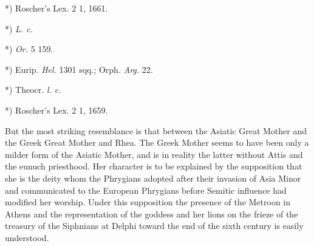 \documentclass[a4paper, 11pt, oneside, polutonikogreek, english]{article}
\begin{document}
*) Roscher's Lex. 2 1, 1661.

*) \emph{L. c.}

*) \emph{Or.} 5 159.

*) Eurip. \emph{Hel.} 1301 sqq.; Orph. \emph{Arg.} 22.

*) Theocr. \emph{l. c.}

*) Roscher's Lex. 2 1, 1659.

But the most striking resemblance is that between the Asiatic Great Mother and the Greek Great Mother and Rhea. The Greek Mother seems to have been only a milder form of the Asiatic Mother, and is in reality the latter without Attis and the eunuch priesthood. Her character is to be explained by the supposition that she is the deity whom the Phrygians adopted after their invasion of Asia Minor and communicated to the European Phrygians before Semitic influence had modified her worship. Under this supposition the presence of the Metroon in Athens and the representation of the goddess and her lions on the frieze of the treasury of the Siphnians at Delphi toward the end of the sixth century is easily understood.
\end{document}
